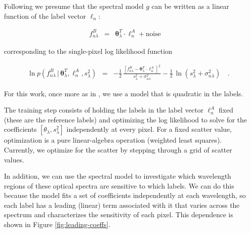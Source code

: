 \documentclass[12pt, preprint]{aastex}
\newcommand{\set}[1]{\bm{#1}}
\newcommand{\starlabel}{\ell}
\newcommand{\starlabelvec}{\set{\starlabel}}
\newcommand{\given}{\,|\,}
\begin{document}
Following \citet{Ness2015} we presume that the spectral model $g$ can be written 
 as a linear function of the label vector $\starlabelvec_n$: 

\begin{eqnarray}
f_{n\lambda}^B &=&
\set{\theta}_\lambda^T \cdot \starlabelvec^A_n + \mbox{noise}
\label{eq:linearmodel}\quad
\end{eqnarray}

\noindent corresponding to the single-pixel log likelihood function

\begin{eqnarray}
\ln p(f_{n\lambda}^B\given\set{\theta}^T_\lambda, \starlabelvec^A_n, s_\lambda^2) &=&
 -\frac{1}{2}\,\frac{[f_{n\lambda}^B - \set{\theta}^T_\lambda \cdot \starlabelvec^A_n]^2}{s_\lambda^2 + \sigma_{n\lambda}^2}
 -\frac{1}{2}\,\ln(s_\lambda^2 + \sigma_{n\lambda}^2)
\label{eq:like}\quad.
\end{eqnarray}

\noindent For this work, once more as in \citet{Ness2015}, we use a model that is quadratic in the labels. 

The training step consists of holding the labels in the label vector $\starlabelvec^A_n$ fixed (these are the reference labels) and optimizing the log likelihood to solve for the coefficients 
$[\theta_\lambda, s_\lambda^2]$ independently at every pixel. 
For a fixed scatter value, optimization is a pure linear-algebra operation (weighted least squares). 
Currently, we optimize for the scatter by stepping through a grid of scatter values.

In addition, we can use the spectral model to investigate
which wavelength regions of these optical spectra
are sensitive to which labels. We can do this because
the model fits a set of coefficients independently
at each wavelength, so each label has a leading (linear)
term associated with it that varies across the spectrum
and characterizes the sensitivity of each pixel. 
This dependence is shown in Figure \ref{fig:leading-coeffs}.
\end{document}
